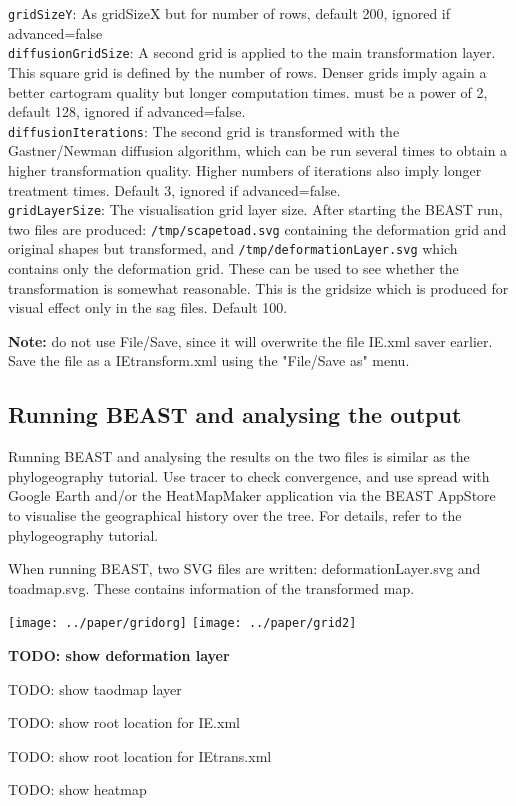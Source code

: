 \documentclass{article}
\begin{document}
{\tt gridSizeY}: As gridSizeX but for number of rows, default 200, ignored if advanced=false\\

{\tt diffusionGridSize}: A second grid is applied to the main transformation layer. 
This square grid is defined by the number of rows. 
Denser grids imply again a better cartogram quality but longer computation times.
must be a power of 2, default 128, ignored if advanced=false.\\

{\tt diffusionIterations}: The second grid is transformed with the Gastner/Newman diffusion 
algorithm, which can be run several times to obtain a higher transformation quality. 
Higher numbers of iterations also imply longer treatment times.
Default 3, ignored if advanced=false.\\

{\tt gridLayerSize}: The visualisation grid layer size. After starting the BEAST run, two files are produced:
{\tt /tmp/scapetoad.svg} containing the deformation grid and original shapes but transformed, and 
{\tt /tmp/deformationLayer.svg} which contains only the deformation grid. These can be used to see whether the transformation is somewhat reasonable. This is the gridsize which is produced for visual effect only in the sag files. 
Default 100.

{\bf Note:} do not use File/Save, since it will overwrite the file IE.xml saver earlier. Save the file as a IEtransform.xml using the "File/Save as" menu.

\subsection*{Running BEAST and analysing the output}

Running BEAST and analysing the results on the two files is similar as the phylogeography tutorial. Use tracer to check convergence, and use spread with Google Earth and/or the HeatMapMaker application via the BEAST AppStore to visualise the geographical history over the tree. For details, refer to the phylogeography tutorial.

When running BEAST, two SVG files are written: deformationLayer.svg and toadmap.svg. These contains information of the transformed map.

\texttt{[image: ../paper/gridorg]}
\texttt{[image: ../paper/grid2]}

{\bf \color{red}
TODO: show deformation layer

TODO: show taodmap layer

TODO: show root location for IE.xml

TODO: show root location for IEtrans.xml

TODO: show heatmap
}
\end{document}
